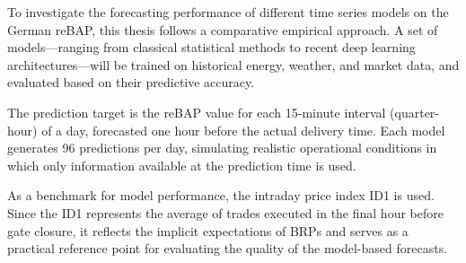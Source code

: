 \documentclass[class=scrbook, crop=false]{standalone}
\begin{document}


To investigate the forecasting performance of different time series models on the German \gls{reBAP}, this thesis follows a comparative empirical approach. A set of models—ranging from classical statistical methods to recent deep learning architectures—will be trained on historical energy, weather, and market data, and evaluated based on their predictive accuracy.

The prediction target is the \gls{reBAP} value for each 15-minute interval (quarter-hour) of a day, forecasted one hour before the actual delivery time. Each model generates 96 predictions per day, simulating realistic operational conditions in which only information available at the prediction time is used.

As a benchmark for model performance, the intraday price index ID1 is used. Since the ID1 represents the average of trades executed in the final hour before gate closure, it reflects the implicit expectations of \gls{BRP}s and serves as a practical reference point for evaluating the quality of the model-based forecasts.
\end{document}
